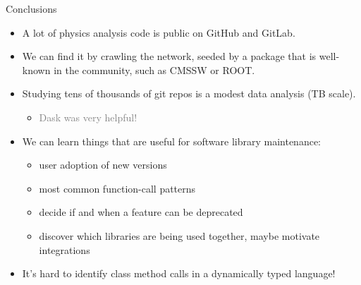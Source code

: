 \documentclass[aspectratio=169]{beamer}
\begin{document}
\begin{frame}{Conclusions}
\vspace{0.35 cm}
\large
\begin{itemize}\setlength{\itemsep}{0.25 cm}
\item<1-> A lot of physics analysis code is public on GitHub and GitLab.
\item<2-> We can find it by crawling the network, seeded by a package that is well-known in the community, such as CMSSW or ROOT.
\item<3-> Studying tens of thousands of git repos is a modest data analysis (TB scale).\hspace{-1 cm}
\begin{itemize}\setlength{\itemsep}{0.1 cm}
\item \textcolor{gray}{Dask was very helpful!}
\end{itemize}
\item<4-> We can learn things that are useful for software library maintenance:
\begin{itemize}\setlength{\itemsep}{0.1 cm}
\item user adoption of new versions
\item most common function-call patterns
\item decide if and when a feature can be deprecated
\item discover which libraries are being used together, maybe motivate integrations
\end{itemize}
\item<5->{It's hard to identify class method calls in a dynamically typed language!}
\end{itemize}

\vspace{0.25 cm}

\vspace{0.1 cm}
\scriptsize
{}
\end{frame}
\end{document}
